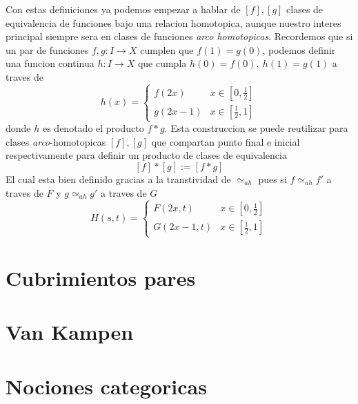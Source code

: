 \documentclass[letterpaper]{article}
\theoremstyle{definition}
\theoremstyle{plain}
\begin{document}
Con estas definiciones ya podemos empezar a hablar de \([f],[g]\) clases
de equivalencia de funciones bajo una relacion homotopica, aunque nuestro
interes principal siempre sera en clases de funciones \emph{arco
  homotopicas}. Recordemos que si un par de funciones \(f,g : I \to X\)
cumplen que \(f(1) = g(0)\), podemos definir una funcion continua \(h: I \to X\)
que cumpla \(h(0) = f(0),\ h(1) = g(1)\) a traves de
\[ h(x) = \begin{cases}
    f(2x) & x \in [0,\frac{1}{2}] \\
    g(2x - 1) & x \in [\frac{1}{2} , 1]
  \end{cases}
\]
donde \(h\) es denotado el producto \(f * g\). Esta construccion se puede
reutilizar para clases \emph{arco}-homotopicas \([f],[g]\) que compartan
punto final e inicial respectivamente para definir un producto de clases
de equivalencia
\[ [f] * [g] := [f * g]\]
El cual esta bien definido gracias a la transtividad de \(\simeq_{ah}\)
pues si \(f \simeq_{ah} f'\) a traves de \(F\) y \(g \simeq_{ah} g'\) a
traves de \(G\)
\[H(s,t) = \begin{cases}
    F(2x,t) & x \in [0, \frac{1}{2}] \\
    G(2x - 1, t) & x \in [\frac{1}{2} , 1]
  \end{cases}
\]
\section{Cubrimientos pares}

\section{Van Kampen}

\section{Nociones categoricas}
\end{document}
